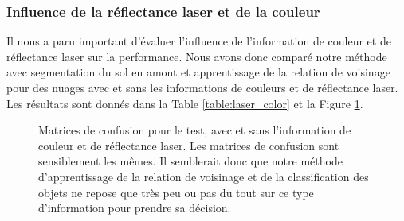 \documentclass[a4paper, onecolumn, 11pt]{article}
\begin{document}


\subsubsection{Influence de la réflectance laser et de la couleur}

Il nous a paru important d'évaluer l'influence de l'information de couleur et de réflectance laser sur la performance. Nous avons donc comparé notre méthode avec segmentation du sol en amont et apprentissage de la relation de voisinage pour des nuages avec et sans les informations de couleurs et de réflectance laser. Les résultats sont donnés dans la Table \ref{table:laser_color} et la Figure \ref{fig:laser_color}. 

\begin{figure}
    \centering
    \qquad
    \caption{Matrices de confusion pour le test, avec et sans l'information de couleur et de réflectance laser. Les matrices de confusion sont sensiblement les mêmes. Il semblerait donc que notre méthode d'apprentissage de la relation de voisinage et de la classification des objets ne repose que très peu ou pas du tout sur ce type d'information pour prendre sa décision.}
    \label{fig:laser_color}
\end{figure}
\end{document}
